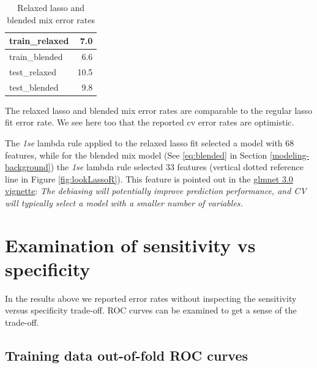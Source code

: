 \documentclass[
]{book}
\begin{document}
\begin{table}

\caption{\label{tab:hcc5hmC-glmnetFit-lookLassoR2}Relaxed lasso and blended mix error rates}
\centering
\begin{tabular}[t]{l|r}
\hline
train\_relaxed & 7.0\\
\hline
train\_blended & 6.6\\
\hline
test\_relaxed & 10.5\\
\hline
test\_blended & 9.8\\
\hline
\end{tabular}
\end{table}

The relaxed lasso and blended mix error rates are comparable to the
regular lasso fit error rate. We see here too that the reported cv
error rates are optimistic.

The \emph{1se} lambda rule applied to the relaxed lasso fit selected a model with
\(68\) features,
while for the blended mix model
(See \eqref{eq:blended} in Section \ref{modeling-background})
the \emph{1se} lambda rule selected
\(33\) features (vertical
dotted reference line in Figure \ref{fig:lookLassoR}).
This feature is pointed out in the
\href{https://cran.r-project.org/web/packages/glmnet/vignettes/relax.pdf}{glmnet 3.0 vignette}:
\emph{The debiasing will potentially improve prediction performance,
and CV will typically select a model with a smaller number of variables.}

\hypertarget{examination-of-sensitivity-vs-specificity}{%
\section{Examination of sensitivity vs specificity}\label{examination-of-sensitivity-vs-specificity}}

In the results above we reported error rates without inspecting the
sensitivity versus specificity trade-off. ROC curves can be examined
to get a sense of the trade-off.

\hypertarget{training-data-out-of-fold-roc-curves}{%
\subsection{Training data out-of-fold ROC curves}\label{training-data-out-of-fold-roc-curves}}
\end{document}
